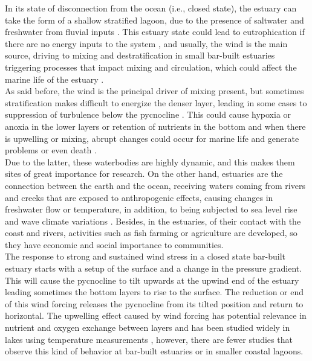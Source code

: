 \documentclass[tesis.tex]{subfiles}
\begin{document}
In its state of disconnection from the ocean (i.e., closed state), the estuary can take the form of a shallow stratified lagoon, due to the presence of saltwater and freshwater from fluvial inputs \citep{Behrens2016}. This estuary state could lead to eutrophication if there are no energy inputs to the system \citep{nunes2014responses}, and usually, the wind is the main source, driving to mixing and destratification in small bar-built estuaries \citep{Gale2006} triggering processes that impact mixing and circulation, which could affect the marine life of the estuary \citep{marti2008relating}. \\

As said before, the wind is the principal driver of mixing present, but sometimes stratification makes difficult to energize the denser layer, leading in some cases to suppression of turbulence below the pycnocline \citep{Cousins2010}. This could cause hypoxia or anoxia in the lower layers \citep{Kelly2018} or retention of nutrients in the bottom \citep{Cousins2010} and when there is upwelling or mixing, abrupt changes could occur for marine life and generate problems or even death \citep{marti2008relating}.\\  

Due to the latter, these waterbodies are highly dynamic, and this makes them sites of great importance for research. On the other hand, estuaries are the connection between the earth and the ocean, receiving waters coming from rivers and creeks that are exposed to anthropogenic effects, causing changes in freshwater flow or temperature, in addition, to being subjected to sea level rise and wave climate variations \citep{grez2020evidence, holt2010potential, thorne2021wetlands}. Besides, in the estuaries, of their contact with the coast and rivers, activities such as fish farming or agriculture are developed, so they have economic and social importance to communities. \\

The response to strong and sustained wind stress in a closed state bar-built estuary starts with a setup of the surface and a change in the pressure gradient. This will cause the pycnocline to tilt upwards at the upwind end of the estuary leading sometimes the bottom layers to rise to the surface. The reduction or end of this wind forcing releases the pycnocline from its tilted position and return to horizontal. The upwelling effect caused by wind forcing has potential relevance in nutrient and oxygen exchange between layers \citep{Kelly2018} and has been studied widely in lakes using temperature measurements \citep{Coman2012, delafuente2010strong, roberts2021setup}, however, there are fewer studies that observe this kind of behavior at bar-built estuaries or in smaller coastal lagoons. \\
\end{document}
